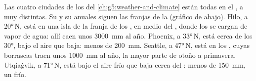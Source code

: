 \begin{example}\label{ex:g8:winds-global-circulation:four-towns}
Las cuatro ciudades de los  del \cref{ch:g5:weather-and-climate}
están todas en el , a  muy distintas. Su  y
su  anuales siguen las franjas de la  (gráfico de
abajo). Hilo, a \ang{20}\,N, está en una isla de la franja de los ,
en medio del , donde los  se cargan de vapor de agua: allí
caen unos \qty{3000}{mm} al año. Phoenix, a \ang{33}\,N, está cerca de los
\ang{30}, bajo el aire que baja: menos de \qty{200}{mm}. Seattle, a
\ang{47}\,N, está en los , cuyas borrascas traen unos
\qty{1000}{mm} al año, la mayor parte de otoño a primavera. Utqiaġvik, a
\ang{71}\,N, está bajo el aire frío que baja cerca del : menos de
\qty{150}{mm}, un  frío.
\end{example}

